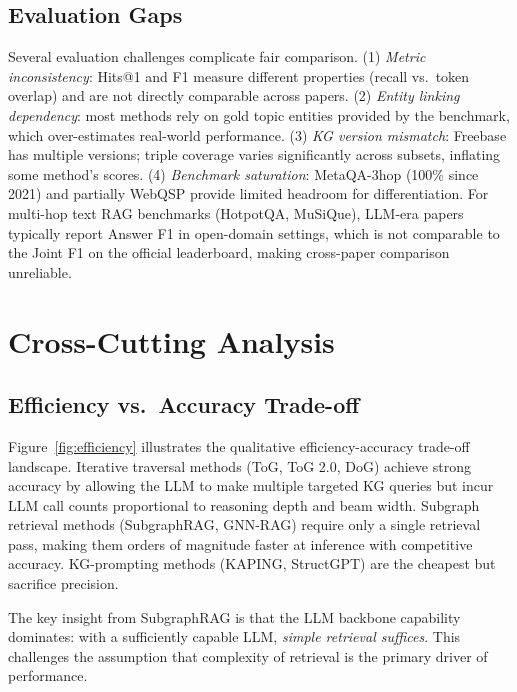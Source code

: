 \documentclass[11pt]{article}
\begin{document}
\subsection{Evaluation Gaps}

Several evaluation challenges complicate fair comparison. (1) \emph{Metric inconsistency}: Hits@1 and F1 measure different properties (recall vs.\ token overlap) and are not directly comparable across papers. (2) \emph{Entity linking dependency}: most methods rely on gold topic entities provided by the benchmark, which over-estimates real-world performance. (3) \emph{KG version mismatch}: Freebase has multiple versions; triple coverage varies significantly across subsets, inflating some method's scores. (4) \emph{Benchmark saturation}: MetaQA-3hop (100\% since 2021) and partially WebQSP provide limited headroom for differentiation. For multi-hop text RAG benchmarks (HotpotQA, MuSiQue), LLM-era papers typically report Answer F1 in open-domain settings, which is not comparable to the Joint F1 on the official leaderboard, making cross-paper comparison unreliable.

\section{Cross-Cutting Analysis}
\label{sec:analysis}

\subsection{Efficiency vs.\ Accuracy Trade-off}

Figure~\ref{fig:efficiency} illustrates the qualitative efficiency-accuracy trade-off landscape. Iterative traversal methods (ToG, ToG 2.0, DoG) achieve strong accuracy by allowing the LLM to make multiple targeted KG queries but incur LLM call counts proportional to reasoning depth and beam width. Subgraph retrieval methods (SubgraphRAG, GNN-RAG) require only a single retrieval pass, making them orders of magnitude faster at inference with competitive accuracy. KG-prompting methods (KAPING, StructGPT) are the cheapest but sacrifice precision.

The key insight from SubgraphRAG \cite{wang2025subgraphrag} is that the LLM backbone capability dominates: with a sufficiently capable LLM, \emph{simple retrieval suffices}. This challenges the assumption that complexity of retrieval is the primary driver of performance.
\end{document}
